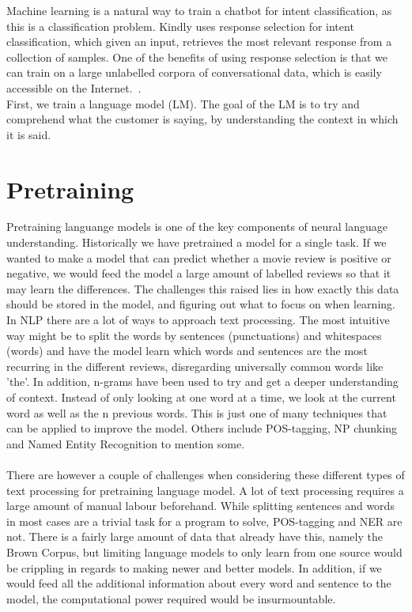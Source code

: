 \documentclass{report}
\begin{document}
\noindent
Machine learning is a natural way to train a chatbot for intent classification, as this is a classification problem.
Kindly uses response selection for intent classification, which given an input, retrieves the most relevant response from a collection of samples. One of the benefits of using response selection is that we can train on a large unlabelled corpora of conversational data, which is easily accessible on the Internet.~\cite{Henderson-Task-Oriented}.\\
First, we train a language model (LM). The goal of the LM is to try and comprehend what the customer is saying, by understanding the context in which it is said.

\section{Pretraining}
Pretraining languange models is one of the key components of neural language understanding. Historically we have pretrained a model for a single task. If we wanted to make a model that can predict whether a movie review is positive or negative, we would feed the model a large amount of labelled reviews so that it may learn the differences. The challenges this raised lies in how exactly this data should be stored in the model, and figuring out what to focus on when learning. In NLP there are a lot of ways to approach text processing. The most intuitive way might be to split the words by sentences (punctuations) and whitespaces (words) and have the model learn which words and sentences are the most recurring in the different reviews, disregarding universally common words like 'the'. In addition, n-grams have been used to try and get a deeper understanding of context. Instead of only looking at one word at a time, we look at the current word as well as the n previous words. This is just one of many techniques that can be applied to improve the model. Others include POS-tagging, NP chunking and Named Entity Recognition to mention some.\\\\
\noindent
There are however a couple of challenges when considering these different types of text processing for pretraining language model. A lot of text processing requires a large amount of manual labour beforehand. While splitting sentences and words in most cases are a trivial task for a program to solve, POS-tagging and NER are not. There is a fairly large amount of data that already have this, namely the Brown Corpus, but limiting language models to only learn from one source would be crippling in regards to making newer and better models. In addition, if we would feed all the additional information about every word and sentence to the model, the computational power required would be insurmountable.
\end{document}
